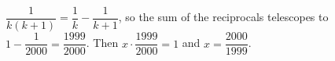 $\dfrac{1}{k(k+1)}=\dfrac{1}{k}-\dfrac{1}{k+1}$, so the sum of the reciprocals telescopes to $1-\dfrac{1}{2000}=\dfrac{1999}{2000}$. Then $x\cdot\dfrac{1999}{2000}=1$ and $x=\boxed{\dfrac{2000}{1999}}$.
